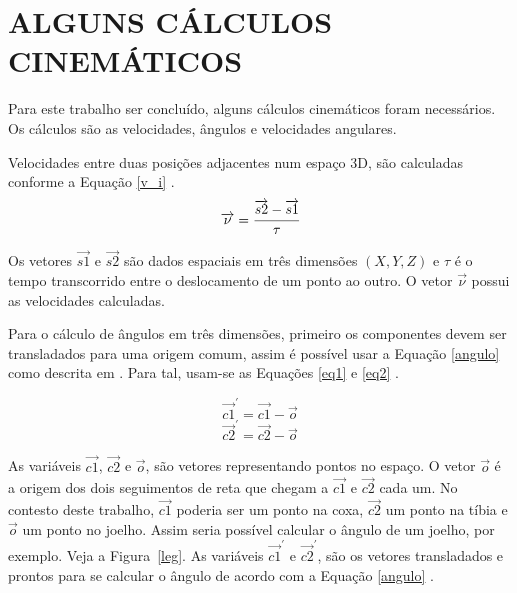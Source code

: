 \section{ALGUNS CÁLCULOS CINEMÁTICOS}
\label{cinematica}
Para este trabalho ser concluído, alguns cálculos cinemáticos foram necessários. Os cálculos são  as velocidades, ângulos e velocidades angulares.

Velocidades entre duas posições adjacentes num espaço 3D, são calculadas conforme a Equação \ref{v_i} \cite{Poole2011}.
\begin{equation}
	\label{v_i}
	\overrightarrow{\nu} =  \cfrac{\overrightarrow{s2} - \overrightarrow{s1}}{\tau}
\end{equation}

Os vetores $\overrightarrow{s1}$ e $\overrightarrow{s2}$ são dados espaciais em três dimensões $(X, Y, Z)$ e $\tau$ é o tempo transcorrido entre o deslocamento de um ponto ao outro. O vetor $\overrightarrow{\nu}$ possui as velocidades calculadas.

Para o cálculo de ângulos em três dimensões, primeiro os componentes devem ser transladados para uma origem comum, assim é possível usar a 
Equação \ref{angulo} como descrita em . 
Para tal, usam-se as Equações \ref{eq1} e \ref{eq2} \cite{Poole2011}.

\begin{equation}
	\label{eq1}
	\overrightarrow{c1}^\prime =  \overrightarrow{c1} - \overrightarrow{o}
\end{equation}
\begin{equation}
	\label{eq2}
	\overrightarrow{c2}^\prime =  \overrightarrow{c2} - \overrightarrow{o}
\end{equation}

As variáveis $\overrightarrow{c1}$, $\overrightarrow{c2}$ e $\overrightarrow{o}$, são vetores representando pontos no espaço. 
O vetor $\overrightarrow{o}$ é a origem dos dois seguimentos de reta que chegam a $\overrightarrow{c1}$ e $\overrightarrow{c2}$ cada um. 
No contesto deste trabalho, $\overrightarrow{c1}$ poderia ser um ponto na coxa, $\overrightarrow{c2}$ um ponto na tíbia e $\overrightarrow{o}$ um ponto no joelho. 
Assim seria possível calcular o ângulo de um joelho, por exemplo. Veja a Figura~\ref{leg}. 
As variáveis $\overrightarrow{c1}^\prime$ e $\overrightarrow{c2}^\prime$, são os vetores transladados e prontos para se calcular o ângulo de acordo com a Equação \ref{angulo} \cite{Edwards2006}.

